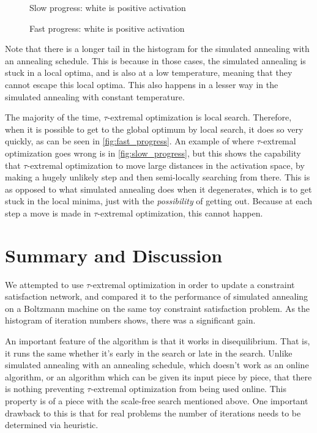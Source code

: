\documentclass[12pt]{article}
\begin{document}
\begin{figure}
  \label{fig:slow_progess}
  \caption{Slow progress: white is positive activation}
\end{figure}
\begin{figure}
  \label{fig:fast_progess}
  \caption{Fast progress: white is positive activation}
\end{figure}

Note that there is a longer tail in the histogram for the simulated annealing with an annealing schedule. This is because in those cases, the simulated annealing is stuck in a local optima, and is also at a low temperature, meaning that they cannot escape this local optima. This also happens in a lesser way in the simulated annealing with constant temperature.

The majority of the time, $\tau$-extremal optimization is local search. Therefore, when it is possible to get to the global optimum by local search, it does so very quickly, as can be seen in \ref{fig:fast_progress}. An example of where $\tau$-extremal optimization goes wrong is in \ref{fig:slow_progress}, but this shows the capability that $\tau$-extremal optimization to move large distances in the activation space, by making a hugely unlikely step and then semi-locally searching from there. This is as opposed to what simulated annealing does when it degenerates, which is to get stuck in the local minima, just with the \emph{possibility} of getting out. Because at each step a move is made in $\tau$-extremal optimization, this cannot happen.

\section{Summary and Discussion}
We attempted to use $\tau$-extremal optimization in order to update a constraint satisfaction network, and compared it to the performance of simulated annealing on a Boltzmann machine on the same toy constraint satisfaction problem. As the histogram of iteration numbers shows, there was a significant gain.

An important feature of the algorithm is that it works in disequilibrium. That is, it runs the same whether it's early in the search or late in the search. Unlike simulated annealing with an annealing schedule, which doesn't work as an online algorithm, or an algorithm which can be given its input piece by piece, that there is nothing preventing $\tau$-extremal optimization from being used online. This property is of a piece with the scale-free search mentioned above. One important drawback to this is that for real problems the number of iterations needs to be determined via heuristic.
\end{document}
